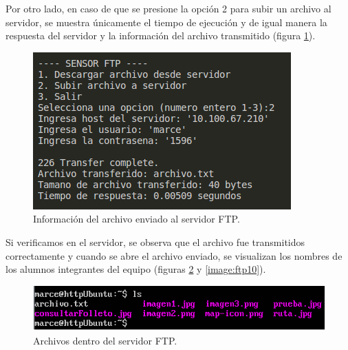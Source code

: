 Por otro lado, en caso de que se presione la opción 2 para subir un archivo al servidor, se muestra únicamente el tiempo de ejecución y de igual manera la respuesta del servidor y la información del archivo transmitido (figura \ref{image:ftp8}).

\FloatBarrier
\begin{figure}[htbp!]
		\centering
			\includegraphics[width=.6 \textwidth]{images/ftp8}
		\caption{Información del archivo enviado al servidor FTP.}
		\label{image:ftp8}
\end{figure}
\FloatBarrier

Si verificamos en el servidor, se observa que el archivo fue transmitidos correctamente y cuando se abre el archivo enviado, se visualizan los nombres de los alumnos integrantes del equipo (figuras \ref{image:ftp9} y \ref{image:ftp10}).

\FloatBarrier
\begin{figure}[htbp!]
		\centering
			\includegraphics[width=.75 \textwidth]{images/ftp9}
		\caption{Archivos dentro del servidor FTP.}
		\label{image:ftp9}
\end{figure}
\FloatBarrier

